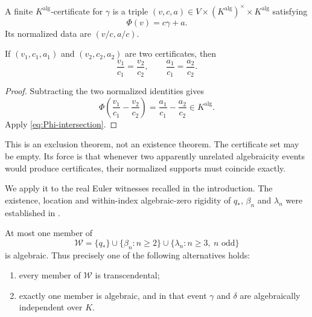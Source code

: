 \begin{definition}
A finite \(K^{\mathrm{alg}}\)-certificate for \(\gamma\) is a triple
\((v,c,a)\in V\times(K^{\mathrm{alg}})^\times\times K^{\mathrm{alg}}\)
satisfying
\begin{equation}\label{eq:certificate}
 \Phi(v)=c\gamma+a.
\end{equation}
Its normalized data are \((v/c,a/c)\).
\end{definition}

\begin{theorem}
\label{thm:certificate-uniqueness}
If \((v_1,c_1,a_1)\) and \((v_2,c_2,a_2)\) are two certificates, then
\begin{equation}\label{eq:normalized-certificate-unique}
 \boxed{\displaystyle
 \frac{v_1}{c_1}=\frac{v_2}{c_2},\qquad
 \frac{a_1}{c_1}=\frac{a_2}{c_2}.}
\end{equation}
\end{theorem}

\begin{proof}
Subtracting the two normalized identities gives
\[
 \Phi\!\left(\frac{v_1}{c_1}-\frac{v_2}{c_2}\right)
 =\frac{a_1}{c_1}-\frac{a_2}{c_2}\in K^{\mathrm{alg}}.
\]
Apply \eqref{eq:Phi-intersection}.
\end{proof}

This is an exclusion theorem, not an existence theorem.  The certificate
set may be empty.  Its force is that whenever two apparently unrelated
algebraicity events would produce certificates, their normalized supports
must coincide exactly.

We apply it to the real Euler witnesses recalled in the introduction.  The
existence, location and within-index algebraic-zero rigidity of \(q_*\),
\(\beta_n\) and \(\lambda_n\) were established in
\cite[Thm.~14.2, Prop.~14.3, and Thm.~14.4]{KEIO2026I}.

\begin{theorem}
\label{thm:cross-index}
At most one member of
\begin{equation}\label{eq:witness-set}
 \mathcal W=
 \{q_*\}\cup\{\beta_n:n\ge2\}
 \cup\{\lambda_n:n\ge3,\ n\text{ odd}\}
\end{equation}
is algebraic.  Thus precisely one of the following alternatives holds:
\begin{enumerate}[label=\textup{(\roman*)}]
 \item every member of \(\mathcal W\) is transcendental;
 \item exactly one member is algebraic, and in that event \(\gamma\) and
 \(\delta\) are algebraically independent over \(K\).
\end{enumerate}
\end{theorem}

